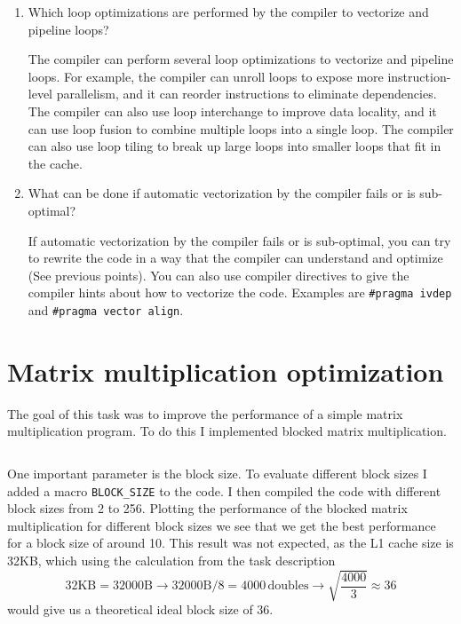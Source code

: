 \documentclass[unicode,11pt,a4paper,oneside,numbers=endperiod,openany]{scrartcl}
\begin{document}
\begin{enumerate}
    \item Which loop optimizations are performed by the compiler to vectorize and pipeline loops?

          The compiler can perform several loop optimizations to vectorize and pipeline loops. For example, the compiler can unroll loops to expose more instruction-level parallelism, and it can reorder instructions to eliminate dependencies. The compiler can also use loop interchange to improve data locality, and it can use loop fusion to combine multiple loops into a single loop. The compiler can also use loop tiling to break up large loops into smaller loops that fit in the cache.

    \item What can be done if automatic vectorization by the compiler fails or is sub-optimal?

          If automatic vectorization by the compiler fails or is sub-optimal, you can try to rewrite the code in a way that the compiler can understand and optimize (See previous points). You can also use compiler directives to give the compiler hints about how to vectorize the code. Examples are \texttt{\#pragma ivdep} and \texttt{\#pragma vector align}.

\end{enumerate}

\section{Matrix multiplication optimization}

The goal of this task was to improve the performance of a simple matrix multiplication program. To do this I implemented blocked matrix multiplication.

\inputminted[firstline=20, lastline=41]{c}{../01b/dgemm-blocked.c}

One important parameter is the block size. To evaluate different block sizes I added a macro \texttt{BLOCK\_SIZE} to the code. I then compiled the code with different block sizes from 2 to 256. Plotting the performance of the blocked matrix multiplication for different block sizes we see that we get the best performance for a block size of around 10. This result was not expected, as the L1 cache size is 32KB, which using the calculation from the task description $$ 32\text{KB} = 32000\text{B} \rightarrow 32000\text{B} / 8 = 4000\,\text{doubles} \rightarrow \sqrt{\frac{4000}{3}} \approx 36$$ would give us a theoretical ideal block size of 36.
\end{document}
